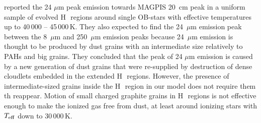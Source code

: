 \documentclass[a4paper,fleqn,usenatbib]{mnras}
\newcommand{\hii}    {H\,{\sc{ii}}~}
\begin{document}
\cite{2012ApJ...760..149P} reported the 24 $\mu$m peak emission towards MAGPIS 20~cm peak in a uniform sample of evolved \hii regions around single OB-stars with effective temperatures up to 40\,000 -- 45\,000\,K. They also expected to find the 24~$\mu$m emission peak between the 8~$\mu$m and 250~$\mu$m emission peaks because 24~$\mu$m emission is thought to be produced by dust grains with an intermediate size relatively to PAHs and big grains. They concluded that the peak of 24 $\mu$m emission is caused by a new generation of dust grains that were re-supplied by destruction of dense cloudlets embedded in the extended \hii regions. However, the presence of intermediate-sized grains inside the \hii region in our model does not require them th reappear. Motion of small charged graphite grains in \hii regions is not effective enough to make the ionized gas free from dust, at least around ionizing stars with $T_{\rm eff}$ down to 30\,000\,K.

\vspace{-0.5cm}
\end{document}
